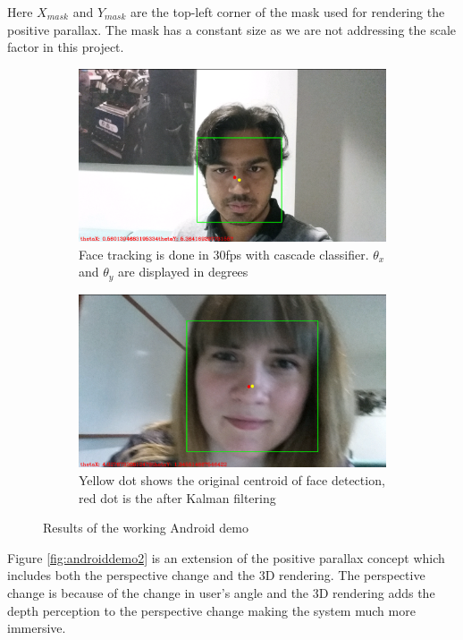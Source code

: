 \documentclass[12pt,twocolumn,letterpaper]{article}
\begin{document}
Here $X_{mask}$ and $Y_{mask}$ are the top-left corner of the mask used for rendering the positive parallax. The mask has a constant size as we are not addressing the scale factor in this project.
\begin{figure}[!htbp]
\centering
\begin{subfigure}{0.5\textwidth}
\includegraphics[scale=0.09]{jai}
\caption{Face tracking is done in 30fps with cascade classifier. $\theta_x$ and $\theta_y$ are displayed in degrees}
\end{subfigure}
\begin{subfigure}{0.5\textwidth}
\includegraphics[scale=0.09]{jenna2}
\caption{Yellow dot shows the original centroid of face detection, red dot is the after Kalman filtering}
\end{subfigure}
\caption{Results of the working Android demo}
\label{fig:androiddemo}
\end{figure}

Figure \ref{fig:androiddemo2} is an extension of the positive parallax concept which includes both the perspective change and the 3D rendering. The perspective change is because of the change in user's angle and the 3D rendering adds the depth perception to the perspective change making the system much more immersive. 
\end{document}
